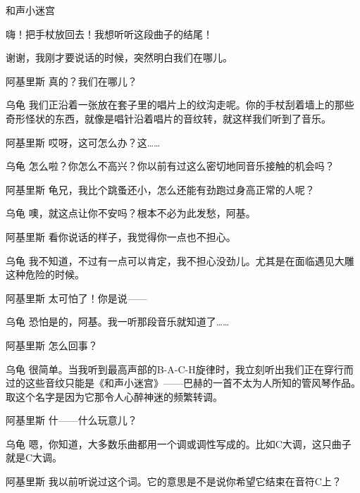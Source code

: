 \begin{dialog}{和声小迷宫}
\begin{dialogue}
\begin{dialogue}
\begin{dialogue}
\begin{dialogue}
      嗨！把手杖放回去！我想听听这段曲子的结尾！


      谢谢，我刚才要说话的时候，突然明白我们在哪儿。

      \item[阿基里斯]真的？我们在哪儿？

      \item[乌龟]我们正沿着一张放在套子里的唱片上的纹沟走呢。你的手杖刮着墙上的那些奇形怪状的东西，就像是唱针沿着唱片的音纹转，就这样我们听到了音乐。

      \item[阿基里斯]哎呀，这可怎么办？这……

      \item[乌龟]怎么啦？你怎么不高兴？你以前有过这么密切地同音乐接触的机会吗？

      \item[阿基里斯]龟兄，我比个跳蚤还小，怎么还能有劲跑过身高正常的人呢？

      \item[乌龟]噢，就这点让你不安吗？根本不必为此发愁，阿基。

      \item[阿基里斯]看你说话的样子，我觉得你一点也不担心。

      \item[乌龟]我不知道，不过有一点可以肯定，我不担心没劲儿。尤其是在面临遇见大雕这种危险的时候。

      \item[阿基里斯]太可怕了！你是说——

      \item[乌龟]恐怕是的，阿基。我一听那段音乐就知道了……

      \item[阿基里斯]怎么回事？

      \item[乌龟]很简单。当我听到最高声部的B-A-C-H旋律时，我立刻听出我们正在穿行而过的这些音纹只能是《和声小迷宫》——巴赫的一首不太为人所知的管风琴作品。取这个名字是因为它那令人心醉神迷的频繁转调。

      \item[阿基里斯]什——什么玩意儿？

      \item[乌龟]嗯，你知道，大多数乐曲都用一个调或调性写成的。比如C大调，这只曲子就是C大调。

      \item[阿基里斯]我以前听说过这个词。它的意思是不是说你希望它结束在音符C上？


\end{dialogue}
\end{dialogue}
\end{dialogue}
\end{dialogue}
\end{dialog}
